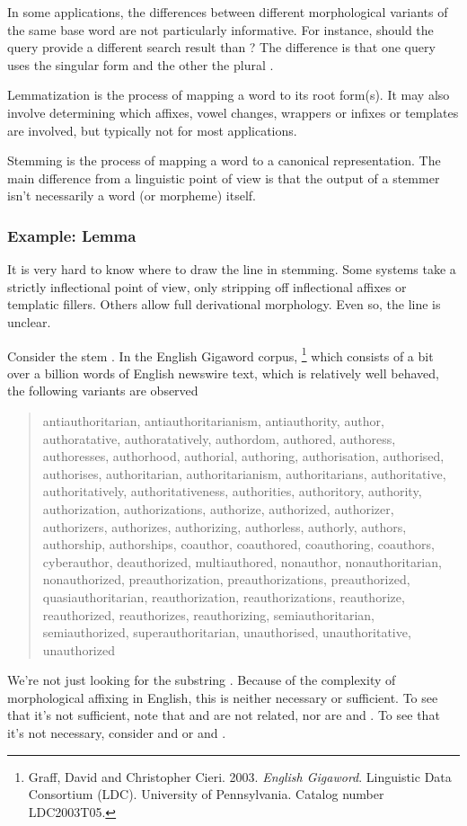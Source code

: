 In some applications, the differences between different morphological
variants of the same base word are not particularly informative.  For
instance, should the query  provide a different
search result than ?  The difference is that one
query uses the singular form  and the other the
plural .

Lemmatization is the process of mapping a word to its root form(s).
It may also involve determining which affixes, vowel changes, wrappers
or infixes or templates are involved, but typically not for most
applications.

Stemming is the process of mapping a word to a canonical
representation.  The main difference from a linguistic point of view
is that the output of a stemmer isn't necessarily a word (or morpheme)
itself. 

\subsubsection{Example: Lemma }

It is very hard to know where to draw the line in stemming.  Some
systems take a strictly inflectional point of view, only stripping off
inflectional affixes or templatic fillers.  Others allow full
derivational morphology.  Even so, the line is unclear.  

Consider the stem .  In the English Gigaword
corpus,%
%
\footnote{Graff, David and Christopher Cieri. 2003. {\it English Gigaword}. Linguistic Data Consortium (LDC). University of Pennsylvania.  Catalog number LDC2003T05.}
%
which consists of a bit over a billion words of English newswire text,
which is relatively well behaved, the following variants are observed
%
\begin{quote}
antiauthoritarian, antiauthoritarianism, antiauthority, author,
authoratative, authoratatively, authordom, authored, authoress,
authoresses, authorhood, authorial, authoring, authorisation,
authorised, authorises, authoritarian, authoritarianism,
authoritarians, authoritative, authoritatively, authoritativeness,
authorities, authoritory, authority, authorization, authorizations,
authorize, authorized, authorizer, authorizers, authorizes,
authorizing, authorless, authorly, authors, authorship, authorships,
coauthor, coauthored, coauthoring, coauthors, cyberauthor,
deauthorized, multiauthored, nonauthor, nonauthoritarian,
nonauthorized, preauthorization, preauthorizations, preauthorized,
quasiauthoritarian, reauthorization, reauthorizations, reauthorize,
reauthorized, reauthorizes, reauthorizing, semiauthoritarian,
semiauthorized, superauthoritarian, unauthorised, unauthoritative,
unauthorized
\end{quote}
%
We're not just looking for the substring .
Because of the complexity of morphological affixing in English, this
is neither necessary or sufficient.  To see that it's not sufficient,
note that  and  are not
related, nor are  and .  To
see that it's not necessary, consider  and
 or  and .

